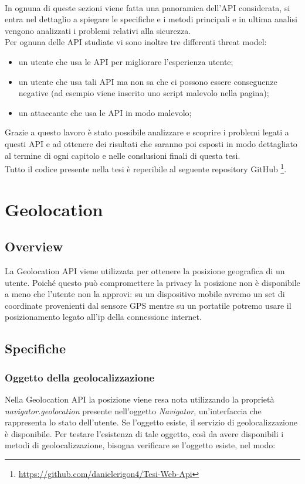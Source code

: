 \documentclass[11pt ,a4paper , twoside , openright ]{book}
\begin{document}
	\\
	In ognuna di queste sezioni viene fatta una panoramica dell'API considerata, si entra nel dettaglio a spiegare le specifiche e i metodi principali e in ultima analisi vengono analizzati i problemi relativi alla sicurezza.
	\\
	Per ognuna delle API studiate vi sono inoltre tre differenti threat model: 
	\begin{itemize}
		\item un utente che usa le API per migliorare l'esperienza utente;
		\item un utente che usa tali API ma non sa che ci possono essere conseguenze negative (ad esempio viene inserito uno script malevolo nella pagina);
		\item un attaccante che usa le API in modo malevolo;
	\end{itemize}
	Grazie a questo lavoro è stato possibile analizzare e scoprire i problemi legati a questi API e ad ottenere dei risultati che saranno poi esposti in modo dettagliato al termine di ogni capitolo e nelle conslusioni finali di questa tesi.
	\\
	Tutto il codice presente nella tesi è reperibile al seguente repository GitHub \footnote{\url{https://github.com/danielerigon4/Tesi-Web-Api}}.
	\cleardoublepage
	
	\chapter{Geolocation}
	\section{Overview}
	La Geolocation API viene utilizzata per ottenere la posizione geografica di un utente. 
	Poiché questo può compromettere la privacy la posizione non è disponibile a meno che l'utente non la approvi: su un dispositivo mobile avremo un set di coordinate provenienti dal sensore GPS mentre su un portatile potremo usare il posizionamento legato all’ip della connessione internet.
	\section{Specifiche}
	
	\subsection{Oggetto della geolocalizzazione}
	Nella Geolocation API la posizione viene resa nota utilizzando la proprietà \textit{navigator.geolocation} \cite{rif4} presente nell'oggetto \textit{Navigator}, un'interfaccia che rappresenta lo stato dell'utente. Se l'oggetto esiste, il servizio di geolocalizzazione è disponibile. Per testare l'esistenza di tale oggetto, così da avere disponibili i metodi di geolocalizzazione, bisogna verificare se l'oggetto esiste, nel modo:
	
	
\end{document}

